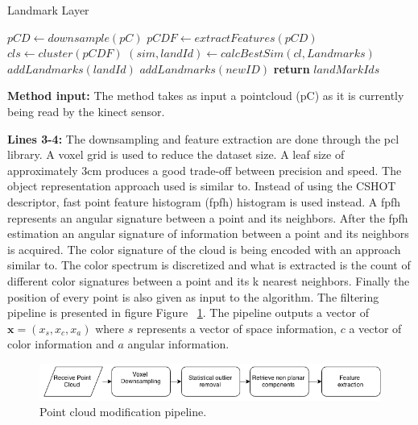 \documentclass [twoside,hidelinks]{article}
\begin{document}
\begin{algorithm}
  \caption{Landmark Layer}\label{euclid}
  \begin{algorithmic} [1]
      \State $pCD \gets downsample (pC)$ 
      \State $pCDF \gets extractFeatures (pCD)$
      \State $cls \gets cluster (pCDF)$  
	      \State $  (sim, landId) \gets calcBestSim (cl, Landmarks) $
			   \State $ addLandmarks (landId)$
			\Else 
			   \State $addLandmarks (newID)$
			\EndIf
      \EndFor
      \State \textbf{return} $ landMarkIds$
    \EndProcedure
  \end{algorithmic}
\end{algorithm}


\textbf{Method input:} The method takes as input a pointcloud (pC) as it is currently being read by the kinect sensor.

\textbf{Lines 3-4:} The downsampling and feature extraction are done through the pcl\cite{pcl} library. A voxel grid is used to reduce the dataset size. A leaf size of approximately 3cm produces a good trade-off between precision and speed. The object representation approach used is similar to\cite{objectpointSLAM}. Instead of using the CSHOT descriptor, fast point feature histogram (fpfh)\cite{fpfh} histogram is used instead. A fpfh represents an angular signature between a point and its neighbors. After the fpfh estimation an angular signature of information between a point and its neighbors is acquired. The color signature of the cloud is being encoded with an approach similar to\cite{smcddp}. The color spectrum is discretized and what is extracted is the count of different color signatures between a point and its k nearest neighbors. Finally the position of every point is also given as input to the algorithm. The filtering pipeline is presented in figure Figure ~\ref{pcl:mod}. The pipeline outputs a vector of $ \textbf{x} =  (x_s, x_c, x_a) $  where $s$ represents a vector of space information, $c$ a vector of color information and $a$ angular information. 

\begin{figure} [ht!]
  \centering
    \includegraphics [width=1\textwidth]{Basic}
  \caption{Point cloud modification pipeline.}
  \label{pcl:mod}
\end{figure}
\end{document}
